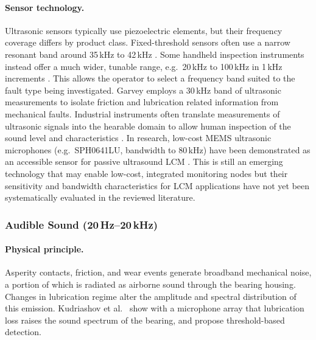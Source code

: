 \paragraph{Sensor technology.}
Ultrasonic sensors typically use piezoelectric elements, but their frequency coverage differs by product class. Fixed-threshold sensors often use a narrow resonant band around 35\,kHz to 42\,kHz \cite{ue_systems_ultra-trak_2026,skf_ultrasound_2026}. Some handheld inspection instruments instead offer a much wider, tunable range, e.g.\ 20\,kHz to 100\,kHz in 1\,kHz increments \cite{ue_systems_ultraprobe_2026}. This allows the operator to select a frequency band suited to the fault type being investigated. Garvey \cite{garvey_monitoring_2019} employs a 30\,kHz band of ultrasonic measurements to isolate friction and lubrication related information from mechanical faults. Industrial instruments often translate measurements of ultrasonic signals into the hearable domain to allow human inspection of the sound level and characteristics \cite{lineham_ultrasonic_2008}. In research, low-cost MEMS ultrasonic microphones (e.g.\ SPH0641LU, bandwidth to 80\,kHz) have been demonstrated as an accessible sensor for passive ultrasound LCM \cite{jakobsen_low_2024}. This is still an emerging technology that may enable low-cost, integrated monitoring nodes but their sensitivity and bandwidth characteristics for LCM applications have not yet been systematically evaluated in the reviewed literature.

\subsubsection{Audible Sound (20\,Hz--20\,kHz)}
\label{subsubsec:sound}

\paragraph{Physical principle.} Asperity contacts, friction, and wear events generate broadband mechanical noise, a portion of which is radiated as airborne sound through the bearing housing. Changes in lubrication regime alter the amplitude and spectral distribution of this emission. Kudriashov et al.\ \cite{georgiev_microphone_2017} show with a microphone array that lubrication loss raises the sound spectrum of the bearing, and propose threshold-based detection.

